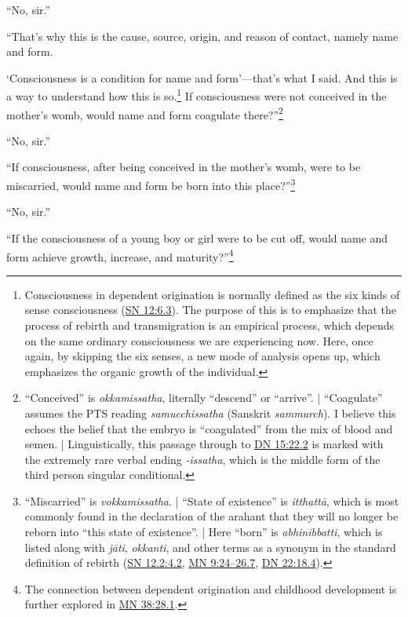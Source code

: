 \documentclass[12pt,openany]{book}%
\begin{document}
“No, sir.” 

“That’s why this is the cause, source, origin, and reason of contact, namely name and form. 

‘Consciousness is a condition for name and form’—that’s what I said. And this is a way to understand how this is so.\footnote{Consciousness in dependent origination is normally defined as the six kinds of sense consciousness (\href{https://suttacentral.net/sn12/en/sujato\#6.3}{SN 12:6.3}). The purpose of this is to emphasize that the process of rebirth and transmigration is an empirical process, which depends on the same ordinary consciousness we are experiencing now. Here, once again, by skipping the six senses, a new mode of analysis opens up, which emphasizes the organic growth of the individual. } If consciousness were not conceived in the mother’s womb, would name and form coagulate there?”\footnote{“Conceived” is \textit{okkamissatha}, literally “descend” or “arrive”. | “Coagulate” assumes the PTS reading \textit{samucchissatha} (Sanskrit \textit{sammurch}). I believe this echoes the belief that the embryo is “coagulated” from the mix of blood and semen. | Linguistically, this passage through to \href{https://suttacentral.net/dn15/en/sujato\#22.2}{DN 15:22.2} is marked with the extremely rare verbal ending \textit{-issatha}, which is the middle form of the third person singular conditional. } 

“No, sir.” 

“If consciousness, after being conceived in the mother’s womb, were to be miscarried, would name and form be born into this place?”\footnote{“Miscarried” is \textit{vokkamissatha}. | “State of existence” is \textit{\textsanskrit{itthattā}}, which is most commonly found in the declaration of the arahant that they will no longer be reborn into “this state of existence”. | Here “born” is \textit{abhinibbatti}, which is listed along with \textit{\textsanskrit{jāti}}, \textit{okkanti}, and other terms as a synonym in the standard definition of rebirth (\href{https://suttacentral.net/sn12.2/en/sujato\#4.2}{SN 12.2:4.2}, \href{https://suttacentral.net/mn9/en/sujato\#24-26.7}{MN 9:24–26.7}, \href{https://suttacentral.net/dn22/en/sujato\#18.4}{DN 22:18.4}). } 

“No, sir.” 

“If the consciousness of a young boy or girl were to be cut off, would name and form achieve growth, increase, and maturity?”\footnote{The connection between dependent origination and childhood development is further explored in \href{https://suttacentral.net/mn38/en/sujato\#28.1}{MN 38:28.1}. } 
\end{document}
